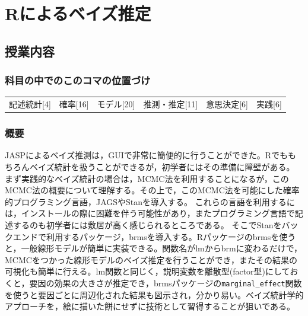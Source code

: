 \section{Rによるベイズ推定}
\label{D1_lesson29}

\subsection{授業内容}
\subsubsection{科目の中でのこのコマの位置づけ}
\begin{tabular}[t]{cccccc}
    記述統計[4] & 確率[16] & モデル[20] & 推測・推定[11] & 意思決定[6] & 実践[6]
\end{tabular}
\subsubsection{概要}
JASPによるベイズ推測は，GUIで非常に簡便的に行うことができた。Rでももちろんベイズ統計を扱うことができるが，初学者にはその準備に障壁がある。
まず実践的なベイズ統計の場合は，MCMC法を利用することになるが，このMCMC法の概要について理解する。その上で，このMCMC法を可能にした確率的プログラミング言語，JAGSやStanを導入する。
これらの言語を利用するには，インストールの際に困難を伴う可能性があり，またプログラミング言語で記述するのも初学者には敷居が高く感じられるところである。
そこでStanをバックエンドで利用するパッケージ，brmsを導入する。Rパッケージのbrmsを使うと，一般線形モデルが簡単に実装できる。関数名がlmからbrmに変わるだけで，MCMCをつかった線形モデルのベイズ推定を行うことができ，またその結果の可視化も簡単に行える。lm関数と同じく，説明変数を離散型(factor型)にしておくと，要因の効果の大きさが推定でき，brmsパッケージの\verb|marginal_effect|関数を使うと要因ごとに周辺化された結果も図示され，分かり易い。ベイズ統計学的アプローチを，絵に描いた餅にせずに技術として習得することが狙いである。
